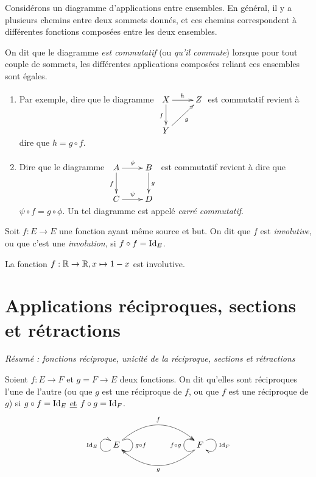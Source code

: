 \begin{definition}
Considérons un diagramme d'applications entre ensembles. En général, il y a plusieurs chemins entre deux sommets donnés, et ces chemins correspondent à différentes fonctions composées entre les deux ensembles.

On dit que le diagramme \emph{est commutatif} (ou \emph{qu'il commute}) lorsque pour tout couple de sommets, les différentes applications composées reliant ces ensembles sont égales.
\end{definition}

\begin{exemple}
\begin{enumerate}
\item  Par exemple, dire que le diagramme
$
\xymatrix{
X \ar[d]_{f} \ar[r]^{h}& Z \\
Y \ar[ur]_{g}& 
}
$
est commutatif revient à dire que $h = g\circ f$.
\item Dire que le diagramme 
$\xymatrix{
A \ar[r]^{\phi} \ar[d]_{f} & B \ar[d]^{g}\\
C \ar[r]^{\psi}& D 
}$
est commutatif revient à dire que $\psi\circ f = g \circ \phi$. Un tel diagramme est appelé \emph{carré commutatif}.
\end{enumerate}
\end{exemple}

\begin{definition}
Soit $f : E\to E$ une fonction ayant même source et but. On dit que $f$ est \emph{involutive}, ou que c'est une \emph{involution}, si $f\circ f=\operatorname{Id}_E$.
\end{definition}

\begin{exemple}
La fonction $f : \mathbb{R}\to \mathbb{R}, x\mapsto 1-x$ est involutive.
\end{exemple}



\section{Applications réciproques, sections et rétractions}

\emph{Résumé : fonctions réciproque, unicité de la réciproque, sections et rétractions}


\begin{definition}
Soient $f : E\to F$ et $g = F\to E$ deux fonctions. On dit qu'elles sont réciproques l'une de l'autre (ou que $g$ est une réciproque de $f$, ou que $f$ est une réciproque de $g$) si $g\circ f = \operatorname{Id}_E$ \underline{et} $f\circ g = \operatorname{Id}_F$. 
\[
\xymatrix{
 E \ar@(dl,ul)^{\Id_E} \ar@/^2pc/[rrr]^{f} \ar@(ur,dr)^{g\circ f} 
& & & 
\ar@/^2pc/[lll]^{g} \ar@(dl,ul)^{f\circ g} F \ar@(ur,dr)^{\Id_F}
}
\]
\end{definition}



